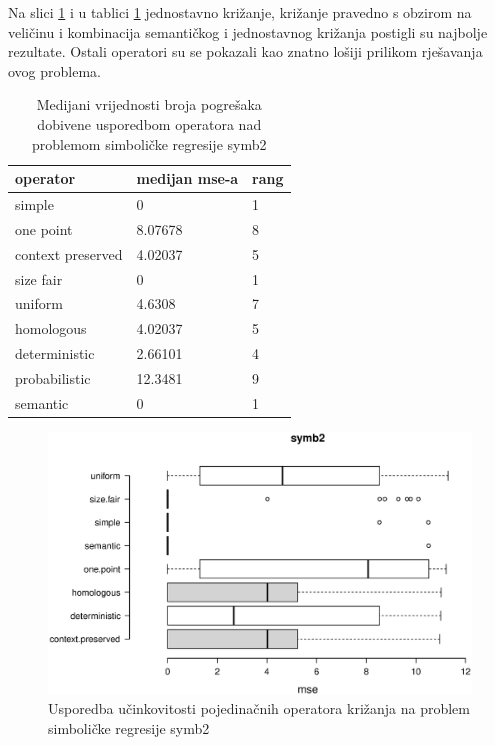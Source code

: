 Na slici \ref{symb2box} i u tablici \ref{symb2table} jednostavno križanje, križanje pravedno s obzirom na veličinu i kombinacija semantičkog i jednostavnog križanja postigli su najbolje rezultate. Ostali operatori su se pokazali kao znatno lošiji prilikom rješavanja ovog problema.

\begin{table}[H]
 	\centering
 \caption{Medijani vrijednosti broja pogrešaka dobivene usporedbom operatora nad problemom simboličke regresije symb2}
    \begin{tabular}{| l | l | l |}
    \hline
    \textbf{operator} & \textbf{medijan mse-a}  & \textbf{rang}\\ \hline
    simple & 0 & 1\\ \hline
    one point & 8.07678 & 8\\ \hline
    context preserved & 4.02037 & 5\\ \hline
    size fair & 0 & 1\\ \hline
    uniform & 4.6308 & 7\\ \hline
    homologous & 4.02037 & 5\\ \hline
    deterministic &2.66101 & 4\\ \hline
    probabilistic & 12.3481 & 9\\ \hline
    semantic & 0 & 1\\ \hline
    \end{tabular}
    
   
    \label{symb2table}
\end{table}

\begin{figure}[H]
	\centering
	\includegraphics[trim=0cm 4cm 0cm 0cm, scale=0.6]{./slike/boxPlots/symb2.eps}
	\caption{Usporedba učinkovitosti pojedinačnih operatora križanja na problem simboličke regresije symb2}
	\label{symb2box}
\end{figure}


